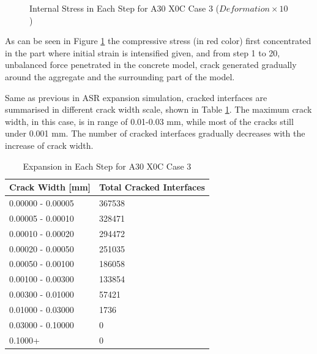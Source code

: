 \begin{figure}[ht!]
      

  \caption{Internal Stress in Each Step for A30 X0C Case 3 ($Deformation \times 10$)}
  \label{fig:DEF_A30X0C_3_IS}
  \end{figure}

As can be seen in Figure \ref{fig:DEF_A30X0C_3_IS} the compressive stress (in red color) first concentrated in the part where initial strain is intensified given, and from step 1 to 20, unbalanced force penetrated in the concrete model, crack generated gradually around the aggregate and the surrounding part of the model.

Same as previous in ASR expansion simulation,  cracked interfaces are summarised in different crack width scale, shown in Table \ref{table:A30X0C_3_Cracks}. The maximum crack width, in this case, is in range of 0.01-0.03 mm, while most of the cracks still under 0.001 mm. The number of cracked interfaces gradually decreases with the increase of crack width.

\begin{table}[!ht]
  \caption{Expansion in Each Step for A30 X0C Case 3}
\centering
\begin{tabular}{ |p{4cm}|p{5cm}| }
\hline
 Crack Width [mm] &  Total Cracked Interfaces \\
 \hline\hline

   0.00000 - 0.00005 & 367538 \\
   0.00005 - 0.00010 & 328471 \\
   0.00010 - 0.00020 & 294472 \\
   0.00020 - 0.00050 & 251035 \\
   0.00050 - 0.00100 & 186058 \\
   0.00100 - 0.00300 & 133854 \\
   0.00300 - 0.01000 & 57421 \\
   0.01000 - 0.03000 & 1736 \\
   0.03000 - 0.10000 & 0 \\
   0.1000+ & 0 \\

  \hline
  \end{tabular}

\label{table:A30X0C_3_Cracks}
\end{table}

